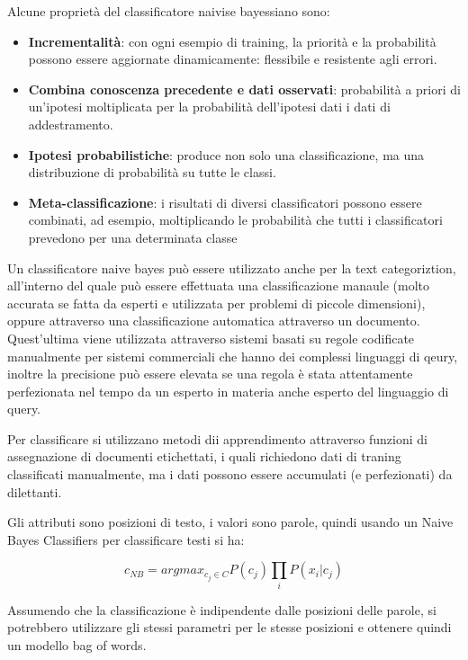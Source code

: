 \documentclass[a4paper]{extarticle}
\begin{document}
Alcune proprietà del classificatore naivise bayessiano sono:
\begin{itemize}
\item \textbf{Incrementalità}: con ogni esempio di training, la priorità e la probabilità possono essere aggiornate dinamicamente: flessibile e resistente agli errori.
\item \textbf{Combina conoscenza precedente e dati osservati}: probabilità a priori di un'ipotesi moltiplicata per la probabilità dell'ipotesi dati i dati di addestramento.
\item \textbf{Ipotesi probabilistiche}: produce non solo una classificazione, ma una distribuzione di probabilità su tutte le classi.
\item \textbf{Meta-classificazione}: i risultati di diversi classificatori possono essere combinati, ad esempio, moltiplicando le probabilità che tutti i classificatori prevedono per una determinata classe
\end{itemize}

Un classificatore naive bayes può essere utilizzato anche per la text categoriztion, all'interno del quale può essere effettuata una classificazione manaule (molto accurata se fatta da esperti e utilizzata per problemi di piccole dimensioni), oppure attraverso una classificazione automatica attraverso un documento. Quest'ultima viene utilizzata attraverso sistemi basati su regole codificate manualmente per sistemi commerciali che hanno dei complessi linguaggi di qeury, inoltre la precisione può essere elevata se una regola è stata attentamente perfezionata nel tempo da un esperto in materia anche esperto del linguaggio di query.

Per classificare si utilizzano metodi dii apprendimento attraverso funzioni di assegnazione di documenti etichettati, i quali richiedono dati di traning classificati manualmente, ma i dati possono essere accumulati (e perfezionati) da dilettanti.

Gli attributi sono posizioni di testo, i valori sono parole, quindi usando un Naive Bayes Classifiers per classificare testi si ha:

\begin{equation*}
c_{NB} = argmax_{c_j\in C} P(c_j) \prod_i P(x_i|c_j)
\end{equation*}

Assumendo che la classificazione è indipendente dalle posizioni delle parole, si potrebbero utilizzare gli stessi parametri per le stesse posizioni e ottenere quindi un modello bag of words.
\end{document}
